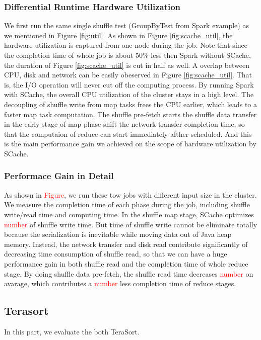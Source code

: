 \subsubsection{Differential Runtime Hardware Utilization} 
We first run the same single shuffle test (GroupByTest from Spark example\cite{sparksource}) as we mentioned in Figure \ref{fig:util}. As shown in Figure \ref{fig:scache_util}, the hardware utilization is captured from one node during the job. Note that since the completion time of whole job is about 50\% less then Spark without SCache, the duration of Figure \ref{fig:scache_util} is cut in half as well. A overlap between CPU, disk and network can be easily obeserved in Figure \ref{fig:scache_util}. That is, the I/O operation will never cut off the computing process. By running Spark with SCache, the overall CPU utilization of the cluster stays in a high level. The decoupling of shuffle write from map tasks frees the CPU earlier, which leads to a faster map task computation. The shuffle pre-fetch starts the shuffle data transfer in the early stage of map phase shift the network transfer completion time, so that the computaion of reduce can start immediately afther scheduled. And this is the main performance gain we achieved on the scope of hardware utilization by SCache.

\subsubsection{Performace Gain in Detail}

As shown in \textcolor{red}{Figure}, we run these tow jobs with different input size in the cluster. We measure the completion time of each phase during the job, including shuffle write/read time and computing time. In the shuffle map stage, SCache optimizes \textcolor{red}{number} of shuffle write time. But time of shuffle write cannot be eliminate totally because the serialization is inevitable while moving data out of Java heap memory. Instead, the network transfer and disk read contribute significantly of decreasing time consumption of shuffle read, so that we can have a huge performance gain in both shuffle read and the completion time of whole reduce stage. By doing shuffle data pre-fetch, the shuffle read time decreases \textcolor{red}{number} on avarage, which contributes a \textcolor{red}{number} less completion time of reduce stages.

\subsection{Terasort}
In this part, we evaluate the both TeraSort\cite{spark-tera}. 

